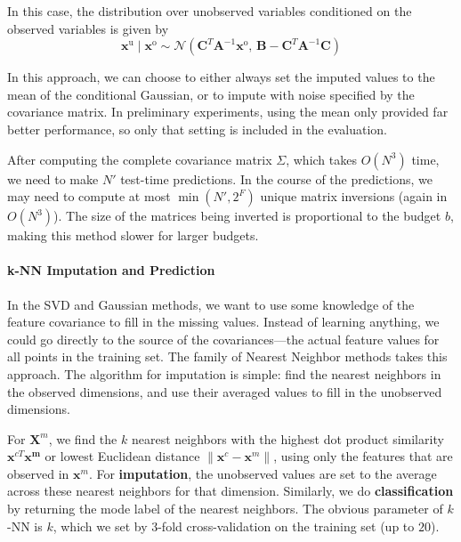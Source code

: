 In this case, the distribution over unobserved variables conditioned on the observed variables is given by
\begin{equation}
\mathbf{x}^\text{u} \mid \mathbf{x}^\text{o} \sim \mathcal{N} \left( \mathbf{C}^T \mathbf{A}^{-1} \mathbf{x}^\text{o},\, \mathbf{B} - \mathbf{C}^T \mathbf{A}^{-1} \mathbf{C} \right)
\end{equation}

In this approach, we can choose to either always set the imputed values to the mean of the conditional Gaussian, or to impute with noise specified by the covariance matrix.
In preliminary experiments, using the mean only provided far better performance, so only that setting is included in the evaluation.

After computing the complete covariance matrix $\Sigma$, which takes $O(N^3)$ time, we need to make $N'$ test-time predictions.
In the course of the predictions, we may need to compute at most $\min(N', 2^F)$ unique matrix inversions (again in $O(N^3)$).
The size of the matrices being inverted is proportional to the budget $b$, making this method slower for larger budgets.

\paragraph{k-NN Imputation and Prediction}
In the SVD and Gaussian methods, we want to use some knowledge of the feature covariance to fill in the missing values.
Instead of learning anything, we could go directly to the source of the covariances---the actual feature values for all points in the training set.
The family of Nearest Neighbor methods takes this approach.
The algorithm for imputation is simple: find the nearest neighbors in the observed dimensions, and use their averaged values to fill in the unobserved dimensions.

For $\mathbf{X}^m$, we find the $k$ nearest neighbors with the highest dot product similarity $\mathbf{x}^{cT} \mathbf{x^m}$ or lowest Euclidean distance $\| \mathbf{x}^{c} - \mathbf{x}^{m} \|$, using only the features that are observed in $\mathbf{x}^{m}$.
For \textbf{imputation}, the unobserved values are set to the average across these nearest neighbors for that dimension.
Similarly, we do \textbf{classification} by returning the mode label of the nearest neighbors.
The obvious parameter of $k$-NN is $k$, which we set by 3-fold cross-validation on the training set (up to $20$).

